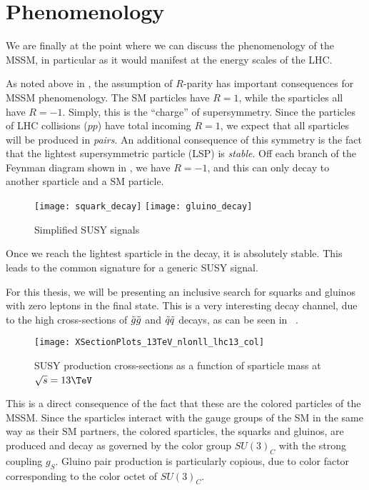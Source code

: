 \section{Phenomenology}

We are finally at the point where we can discuss the phenomenology of the MSSM, in particular as it would manifest at the energy scales of the LHC.

As noted above in , the assumption of $R$-parity has important consequences for MSSM phenomenology.
The SM particles have $R=1$, while the sparticles all have $R=-1$.
Simply, this is the ``charge'' of supersymmetry.
Since the particles of LHC collisions ($pp$) have total incoming $R=1$, we expect that all sparticles will be produced in \textit{pairs}.
An additional consequence of this symmetry is the fact that the lightest supersymmetric particle (LSP)  is \textit{stable}.
Off each branch of the Feynman diagram shown in , we have $R=-1$, and this can only decay to another sparticle and a SM particle.
\begin{figure}[tbp]
\caption{Simplified SUSY signals}\label{fig:signal_feynman}
\texttt{[image: squark\_decay]}
\texttt{[image: gluino\_decay]}
\end{figure}
Once we reach the lightest sparticle in the decay, it is absolutely stable.
This leads to the common signature \met for a generic SUSY signal.

For this thesis, we will be presenting an inclusive search for squarks and gluinos with zero leptons in the final state.
This is a very interesting decay channel, due to the high cross-sections of $\tilde{g} \tilde{g}$ and $\tilde{q} \tilde{q}$ decays, as can be seen in ~\cite{Borschensky:2014cia}.

\begin{figure}[tbp]\label{fig:susy_xsec}
\caption{SUSY production cross-sections as a function of sparticle mass at $\sqrt{s} = 13 \TeV$~\cite{Borschensky:2014cia}}
\texttt{[image: XSectionPlots\_13TeV\_nlonll\_lhc13\_col]}
\end{figure}
This is a direct consequence of the fact that these are the colored particles of the MSSM.
Since the sparticles interact with the gauge groups of the SM in the same way as their SM partners, the colored sparticles, the squarks and gluinos, are produced and decay as governed by the color group $SU(3)_C$ with the strong coupling $g_S$.
Gluino pair production is particularly copious, due to color factor corresponding to the color octet of $SU(3)_C$.

